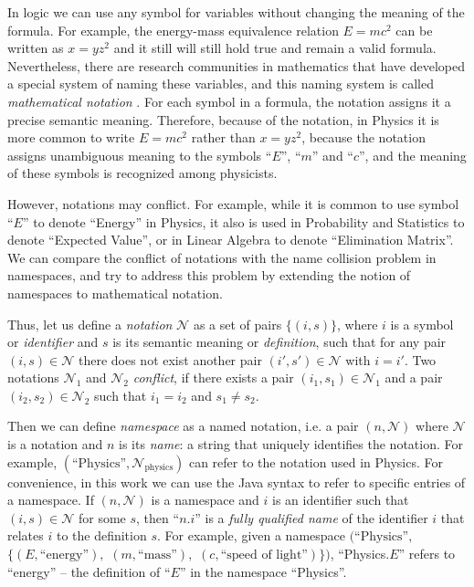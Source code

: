 In logic we can use any symbol for variables without changing the meaning of the formula.
For example, the energy-mass equivalence relation $E = mc^2$ can be written
as $x = y z^2$ and it still will still hold true and remain a valid formula.
Nevertheless, there are research communities in mathematics that have developed
a special system of naming these variables, and this naming system is
called \emph{mathematical notation} \cite{wikinotation}. %
For each symbol in a formula, the notation assigns it a precise semantic
meaning. Therefore, because of the notation, in Physics it is more common
to write $E = mc^2$ rather than $x = y z^2$, because the notation assigns
unambiguous meaning to the symbols ``$E$'', ``$m$'' and ``$c$'', and the
meaning of these symbols is recognized among physicists.

However, notations may conflict. For example, while it is common to use
symbol ``$E$'' to denote ``Energy'' in Physics, it also is used in Probability and
Statistics to denote ``Expected Value'', or in Linear Algebra to denote
``Elimination Matrix''.
We can compare the conflict of notations with the name collision problem
in namespaces, and try to address this problem by extending the notion of
namespaces to mathematical notation.

Thus, let us define a \emph{notation} $\mathcal N$ as a set of pairs $\{ (i, s) \}$,
where $i$ is a symbol or \emph{identifier} and $s$ is its semantic meaning
or \emph{definition}, such that for any pair $(i, s) \in \mathcal N$ there
does not exist another pair $(i', s') \in \mathcal N$ with $i = i'$.
Two notations $\mathcal N_1$ and $\mathcal N_2$
\emph{conflict}, if there exists a pair $(i_1, s_1) \in \mathcal N_1$ and a pair
$(i_2, s_2) \in \mathcal N_2$ such that $i_1 = i_2$ and $s_1 \ne s_2$.

Then we can define \emph{namespace} as a named notation, i.e. a pair
$(n, \mathcal N)$ where $\mathcal N$ is a notation and $n$ is its \emph{name}:
a string that uniquely identifies the notation. For example,
$(\text{``Physics''}, \mathcal N_\text{physics})$ can refer to the notation
used in Physics.
For convenience, in this work we can use the Java syntax to refer to
specific entries of a namespace. If $(n, \mathcal N)$ is a namespace and $i$
is an identifier such that $(i, s) \in \mathcal N$ for some $s$, then
``$n$.$i$'' is a \emph{fully qualified name} of the identifier $i$ that
relates $i$ to the definition $s$. For example,
given a namespace $\big( \text{``Physics''},$ $\{ (E, \text{``energy''}),$
$(m, \text{``mass''}),$ $(c, \text{``speed of light''}) \} \big)$,
``Physics.$E$'' refers to ``energy'' -- the definition of ``$E$'' in the
namespace ``Physics''.

